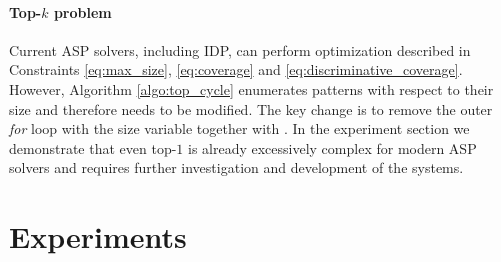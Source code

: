 \paragraph{Top-$k$ problem}
Current ASP solvers, including IDP, can perform optimization described in Constraints \ref{eq:max_size}, \ref{eq:coverage} and \ref{eq:discriminative_coverage}. However, Algorithm \ref{algo:top_cycle} enumerates patterns with respect to their size and therefore needs to be modified. The key change is to remove the outer \textit{for} loop with the size variable together with  \CardinalityConstraint. In the experiment section we demonstrate that even top-$1$ is already excessively complex for modern ASP solvers and requires further investigation and development of the systems. 

\section{Experiments}\label{sec:experiments}

